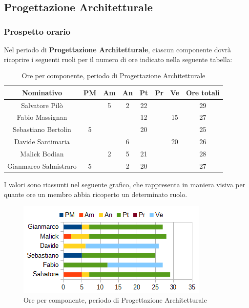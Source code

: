 	\subsection{Progettazione Architetturale}
		\subsubsection{Prospetto orario}
		Nel periodo di \textbf{Progettazione Architetturale}, ciascun componente dovrà ricoprire i seguenti ruoli per il numero di ore indicato nella seguente tabella: \\
		\begin{table}[H]
		\centering
		\begin{tabular}{|c|c|c|c|c|c|c|c|}
			\hline
			\textbf{Nominativo}		& \textbf{PM}	& \textbf{Am}	& \textbf{An}	& \textbf{Pt}	& \textbf{Pr}	& \textbf{Ve}	& \textbf{Ore totali}     \\
			\hline
			Salvatore Pilò			& 		& 5 	& 2		& 22	&		&		& 29 \\
			Fabio Massignan			&		& 		& 		& 12	&		& 15	& 27 \\
			Sebastiano Bertolin		& 5		& 		&  		& 20	&		&		& 25 \\
			Davide Santimaria		&		& 		& 6		&		&		& 20	& 26 \\
			Malick Bodian			& 		& 2		& 5		& 21	&		& 		& 28 \\
			Gianmarco Salmistraro	& 5		& 		& 2		& 20	&		& 		& 27 \\
			\hline
		\end{tabular}
		\caption{Ore per componente, periodo di Progettazione Architetturale}
		\end{table}
		I valori sono riassunti nel seguente grafico, che rappresenta in maniera visiva per quante ore un membro abbia ricoperto un determinato ruolo. \\
		\begin{figure}[H]
			\centering
			\includegraphics[scale=1]{immagini/grafici/progettazione_architetturale-barra.png}
			\caption{Ore per componente, periodo di Progettazione Architetturale}
		\end{figure}
